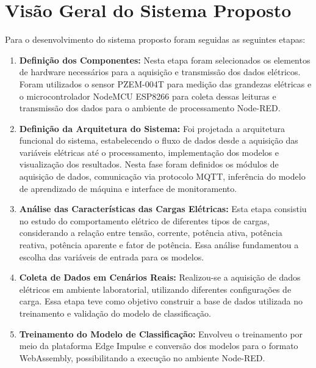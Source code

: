 \section{Visão Geral do Sistema Proposto}

Para o desenvolvimento do sistema proposto foram seguidas as seguintes etapas:

\begin{enumerate}
    \item \textbf{Definição dos Componentes:} Nesta etapa foram selecionados os elementos de hardware necessários para a aquisição e transmissão dos dados elétricos. Foram utilizados o sensor PZEM-004T para medição das grandezas elétricas e o microcontrolador NodeMCU ESP8266 para coleta dessas leituras e transmissão dos dados para o ambiente de processamento Node-RED.
    
    \item \textbf{Definição da Arquitetura do Sistema:} Foi projetada a arquitetura funcional do sistema, estabelecendo o fluxo de dados desde a aquisição das variáveis elétricas até o processamento, implementação dos modelos e visualização dos resultados. Nesta fase foram definidos os módulos de aquisição de dados, comunicação via protocolo MQTT, inferência do modelo de aprendizado de máquina e interface de monitoramento.
    
    \item \textbf{Análise das Características das Cargas Elétricas:} Esta etapa consistiu no estudo do comportamento elétrico de diferentes tipos de cargas, considerando a relação entre tensão, corrente, potência ativa, potência reativa, potência aparente e fator de potência. Essa análise fundamentou a escolha das variáveis de entrada para os modelos.
    
    \item \textbf{Coleta de Dados em Cenários Reais:} Realizou-se a aquisição de dados elétricos em ambiente laboratorial, utilizando diferentes configurações de carga. Essa etapa teve como objetivo construir a base de dados utilizada no treinamento e validação do modelo de classificação.
    
    \item \textbf{Treinamento do Modelo de Classificação:} Envolveu o treinamento por meio da plataforma Edge Impulse e conversão dos modelos para o formato WebAssembly, possibilitando a execução no ambiente Node-RED.
    

\end{enumerate}
